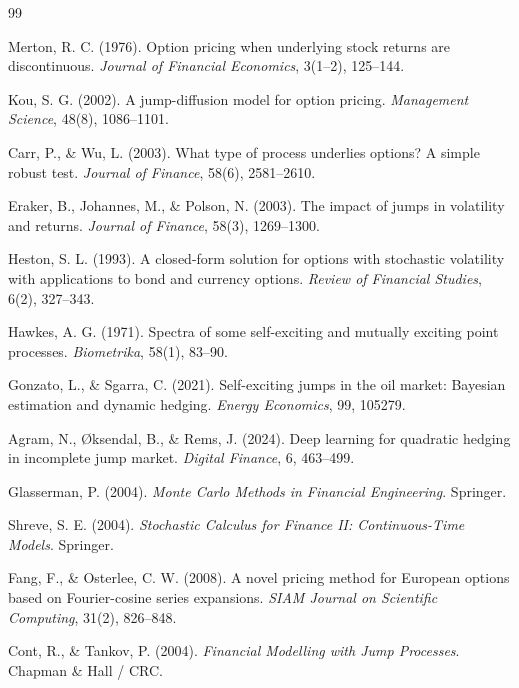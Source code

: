 \documentclass[12pt]{article}
\begin{document}
\begin{thebibliography}{99}

Merton, R. C. (1976).
Option pricing when underlying stock returns are discontinuous.
\textit{Journal of Financial Economics}, 3(1--2), 125--144.

Kou, S. G. (2002).
A jump-diffusion model for option pricing.
\textit{Management Science}, 48(8), 1086--1101.

Carr, P., \& Wu, L. (2003).
What type of process underlies options? A simple robust test.
\textit{Journal of Finance}, 58(6), 2581--2610.

Eraker, B., Johannes, M., \& Polson, N. (2003).
The impact of jumps in volatility and returns.
\textit{Journal of Finance}, 58(3), 1269--1300.

Heston, S. L. (1993).
A closed-form solution for options with stochastic volatility with applications to bond and currency options.
\textit{Review of Financial Studies}, 6(2), 327--343.

Hawkes, A. G. (1971).
Spectra of some self-exciting and mutually exciting point processes.
\textit{Biometrika}, 58(1), 83--90.

Gonzato, L., \& Sgarra, C. (2021).
Self-exciting jumps in the oil market: Bayesian estimation and dynamic hedging.
\textit{Energy Economics}, 99, 105279.

Agram, N., {\O}ksendal, B., \& Rems, J. (2024).
Deep learning for quadratic hedging in incomplete jump market.
\textit{Digital Finance}, 6, 463--499.

Glasserman, P. (2004).
\textit{Monte Carlo Methods in Financial Engineering}.
Springer.

Shreve, S. E. (2004).
\textit{Stochastic Calculus for Finance II: Continuous-Time Models}.
Springer.

Fang, F., \& Osterlee, C. W. (2008).
A novel pricing method for European options based on Fourier-cosine series expansions.
\textit{SIAM Journal on Scientific Computing}, 31(2), 826--848.

Cont, R., \& Tankov, P. (2004).
\textit{Financial Modelling with Jump Processes}.
Chapman \& Hall / CRC.

\end{thebibliography}
\end{document}

